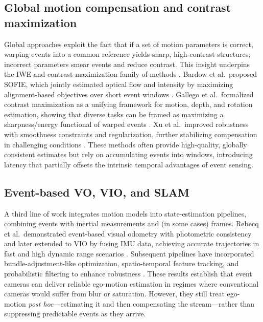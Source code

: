 \subsection{Global motion compensation and contrast maximization}
Global approaches exploit the fact that if a set of motion parameters is correct, warping events into a common reference yields sharp, high-contrast structures; incorrect parameters smear events and reduce contrast. This insight underpins the IWE and contrast-maximization family of methods \cite{Gallego2018CMax}. Bardow et al.\ proposed SOFIE, which jointly estimated optical flow and intensity by maximizing alignment-based objectives over short event windows \cite{Bardow2016SOFIE}. Gallego et al.\ formalized contrast maximization as a unifying framework for motion, depth, and rotation estimation, showing that diverse tasks can be framed as maximizing a sharpness/energy functional of warped events \cite{Gallego2018CMax}. Xu et al.\ improved robustness with smoothness constraints and regularization, further stabilizing compensation in challenging conditions \cite{Xu2020TCI}. These methods often provide high-quality, globally consistent estimates but rely on accumulating events into windows, introducing latency that partially offsets the intrinsic temporal advantages of event sensing.

\subsection{Event-based VO, VIO, and SLAM}
A third line of work integrates motion models into state-estimation pipelines, combining events with inertial measurements and (in some cases) frames. Rebecq et al.\ demonstrated event-based visual odometry with photometric consistency and later extended to VIO by fusing IMU data, achieving accurate trajectories in fast and high dynamic range scenarios \cite{Rebecq2017EVO,Rebecq2019E2VID}. Subsequent pipelines have incorporated bundle-adjustment-like optimization, spatio-temporal feature tracking, and probabilistic filtering to enhance robustness \cite{Gallego2020Survey}. These results establish that event cameras can deliver reliable ego-motion estimation in regimes where conventional cameras would suffer from blur or saturation. However, they still treat ego-motion \emph{post hoc}—estimating it and then compensating the stream—rather than suppressing predictable events as they arrive.


